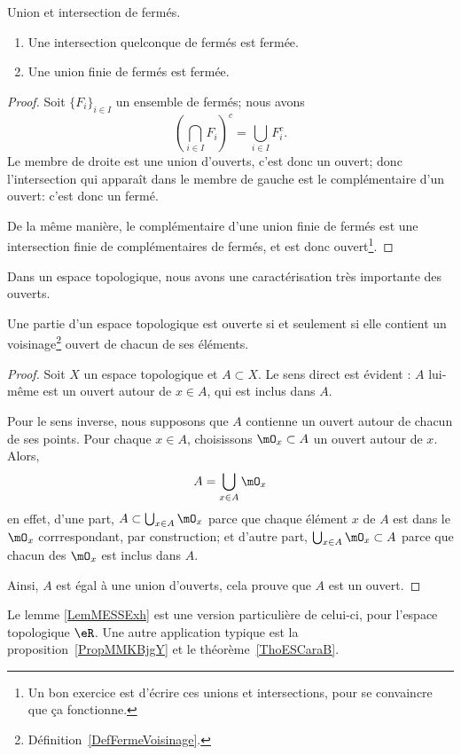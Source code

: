 \begin{lemma}   \label{LemQYUJwPC}
    Union et intersection de fermés.
    \begin{enumerate}
        \item
            Une intersection quelconque de fermés est fermée.
        \item       \label{ItemKJYVooMBmMbG}
            Une union finie de fermés est fermée.
    \end{enumerate}
\end{lemma}

\begin{proof}
    Soit \( \{ F_i \}_{i\in I} \) un ensemble de fermés; nous avons
    \begin{equation}
        \left( \bigcap_{i\in I}F_i \right)^c=\bigcup_{i\in I}F_i^c.
    \end{equation}
    Le membre de droite est une union d'ouverts, c'est donc un ouvert; donc l'intersection qui apparaît dans le membre de gauche est le complémentaire d'un ouvert: c'est donc un fermé.

    De la même manière, le complémentaire d'une union finie de fermés est une intersection finie de complémentaires de fermés, et est donc ouvert\footnote{Un bon exercice est d'écrire ces unions et intersections, pour se convaincre que ça fonctionne.}.
\end{proof}

Dans un espace topologique, nous avons une caractérisation très importante des ouverts.
\begin{theorem}		\label{ThoPartieOUvpartouv}
    Une partie d'un espace topologique est ouverte si et seulement si elle contient un voisinage\footnote{Définition~\ref{DefFermeVoisinage}.} ouvert de chacun de ses éléments.
\end{theorem}

\begin{proof}
    Soit \( X\) un espace topologique et \( A\subset X\). Le sens direct est évident : $A$ lui-même est un ouvert autour de $x\in A$, qui est inclus dans $A$.

Pour le sens inverse, nous supposons que \( A\) contienne un ouvert autour de chacun de ses points. Pour chaque $x\in A$, choisissons $\mO_x\subset A$ un ouvert autour de $x$. Alors,
\begin{equation}	\label{EqAUniondesOx}
	A=\bigcup_{x\in A}\mO_x
\end{equation}
en effet, d'une part, $A\subset\bigcup_{x\in A}\mO_x$ parce que chaque élément $x$ de $A$ est dans le $\mO_x$ corrrespondant, par construction; et d'autre part, $\bigcup_{x\in A}\mO_x\subset A$ parce que chacun des $\mO_x$ est inclus dans $A$.

Ainsi, $A$ est égal à une union d'ouverts, cela prouve que $A$ est un ouvert.
\end{proof}
Le lemme \ref{LemMESSExh} est une version particulière de celui-ci, pour l'espace topologique \( \eR \). Une autre application typique est la proposition~\ref{PropMMKBjgY} et le théorème~\ref{ThoESCaraB}.


